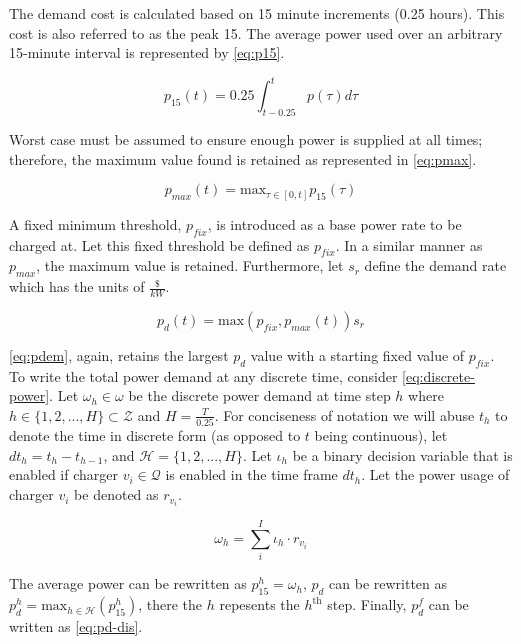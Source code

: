 \documentclass[11pt,a4paper,final]{article}
\newcommand{\Qset}{\mathcal{Q}}             %
\newcommand{\Hset}{\mathcal{H}}             %
\begin{document}
The demand cost is calculated based on 15 minute increments (0.25 hours). This cost is also referred to as the peak 15. The
average power used over an arbitrary 15-minute interval is represented by \ref{eq:p15}.

\begin{equation}
\label{eq:p15}
p_{15}(t) = 0.25 \int_{t-0.25}^{t} p(\tau) d\tau
\end{equation}

Worst case must be assumed to ensure enough power is supplied at all times; therefore, the maximum value found is
retained as represented in \ref{eq:pmax}.

\begin{equation}
\label{eq:pmax}
p_{max}(t) = \text{max}_{\tau \in [0,t]}p_{15}(\tau)
\end{equation}

A fixed minimum threshold, \(p_{fix}\), is introduced as a base power rate to be charged at. Let this fixed threshold be
defined as \(p_{fix}\). In a similar manner as \(p_{max}\), the maximum value is retained. Furthermore, let \(s_r\) define the
demand rate which has the units of \(\frac{\$}{kW}\).

\begin{equation}
\label{eq:pdem}
p_d(t) = \text{max}(p_{fix},p_{max}(t))s_r
\end{equation}

\ref{eq:pdem}, again, retains the largest \(p_{d}\) value with a starting fixed value of \(p_{fix}\). To write the total power
demand at any discrete time, consider \ref{eq:discrete-power}. Let \(\omega_h \in \omega\) be the discrete power demand at time step \(h\)
where \(h \in \{ 1, 2, ..., H \} \subset \mathcal{Z}\) and \(H = \frac{T}{0.25}\). For conciseness of notation we will abuse \(t_h\) to denote
the time in discrete form (as opposed to \(t\) being continuous), let \(dt_h = t_h - t_{h-1}\), and \(\Hset = \{ 1, 2, ..., H
\}\). Let \(\iota_h\) be a binary decision variable that is enabled if charger \(v_i \in \Qset\) is enabled in the time frame
\(dt_h\). Let the power usage of charger \(v_i\) be denoted as \(r_{v_i}\).

\begin{equation}
\label{eq:discrete-power}
  \omega_h = \sum_i^I \iota_h \cdot r_{v_i}
\end{equation}

The average power can be rewritten as \(p_{15}^h = \omega_h\), \(p_d\) can be rewritten as \(p_d^h = \text{max}_{h \in \Hset}
(p_{15}^{h})\), there the \(h\) repesents the \(h^{\text{th}}\) step. Finally, \(p_d^f\) can be written as \ref{eq:pd-dis}.
\end{document}
